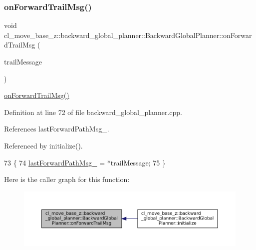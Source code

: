 \subsubsection{\texorpdfstring{on\+Forward\+Trail\+Msg()}{onForwardTrailMsg()}}
{\footnotesize\ttfamily void cl\+\_\+move\+\_\+base\+\_\+z\+::backward\+\_\+global\+\_\+planner\+::\+Backward\+Global\+Planner\+::on\+Forward\+Trail\+Msg (\begin{DoxyParamCaption}\item[{const nav\+\_\+msgs\+::\+Path\+::\+Const\+Ptr \&}]{trail\+Message }\end{DoxyParamCaption})\hspace{0.3cm}{\ttfamily [private]}}

\hyperlink{classcl__move__base__z_1_1backward__global__planner_1_1BackwardGlobalPlanner_a515bde5bfb3ae548f3e19209df1a48b0}{on\+Forward\+Trail\+Msg()} 

Definition at line 72 of file backward\+\_\+global\+\_\+planner.\+cpp.



References last\+Forward\+Path\+Msg\+\_\+.



Referenced by initialize().


\begin{DoxyCode}
73 \{
74     \hyperlink{classcl__move__base__z_1_1backward__global__planner_1_1BackwardGlobalPlanner_a149ee7d22d98271c9ee1da55241d500b}{lastForwardPathMsg\_} = *trailMessage;
75 \}
\end{DoxyCode}
Here is the caller graph for this function\+:
\nopagebreak
\begin{figure}[H]
\begin{center}
\leavevmode
\includegraphics[width=350pt]{classcl__move__base__z_1_1backward__global__planner_1_1BackwardGlobalPlanner_a515bde5bfb3ae548f3e19209df1a48b0_icgraph}
\end{center}
\end{figure}
\mbox{\label{classcl__move__base__z_1_1backward__global__planner_1_1BackwardGlobalPlanner_a3c6784cad10fdadf28323380fe3d6d2b}} 
